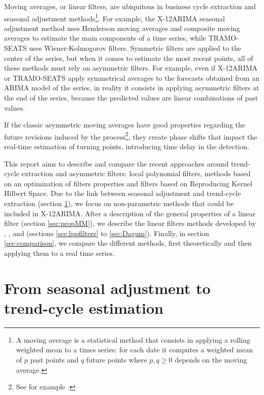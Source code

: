 \documentclass[
  12pt,
  ,
  a4paper]{article}
\newcommand\1{\mathds{1}}
\begin{document}
Moving averages, or linear filters, are ubiquitous in business cycle extraction and seasonal adjustment methods\footnote{
  A moving average is a statistical method that consists in applying a rolling weighted mean to a times series: for each date it computes a weighted mean of \(p\) past points and \(q\) future points where \(p,q\geq0\) depends on the moving average.}.
For example, the X-12ARIMA seasonal adjustment method uses Henderson moving averages and composite moving averages to estimate the main components of a time series, while TRAMO-SEATS uses Wiener-Kolmogorov filters.
Symmetric filters are applied to the center of the series, but when it comes to estimate the most recent points, all of these methods must rely on asymmetric filters.
For example, even if X-12ARIMA or TRAMO-SEATS apply symmetrical averages to the forecasts obtained from an ARIMA model of the series, in reality it consists in applying asymmetric filters at the end of the series, because the predicted values are linear combinations of past values.

If the classic asymmetric moving averages have good properties regarding the future revisions induced by the process\footnote{See for example \textcite{pierce1980SA}.}, they create phase shifts that impact the real-time estimation of turning points, introducing time delay in the detection.

This report aims to describe and compare the recent approaches around trend-cycle extraction and asymmetric filters: local polynomial filters, methods based on an optimization of filters properties and filters based on Reproducing Kernel Hilbert Space.
Due to the link between seasonal adjustment and trend-cycle extraction (section \ref{sec:SAtoTCE}), we focus on non-parametric methods that could be included in X-12ARIMA.
After a description of the general properties of a linear filter (section \ref{sec:propMM}), we describe the linear filters methods developed by \textcite{proietti2008}, \textcite{ch15HBSA}, \textcite{trilemmaWMR2019} and \textcite{dagumbianconcini2008} (sections \ref{sec:lppfilters} to \ref{sec:Dagum}).
Finally, in section \ref{sec:comparison}, we compare the different methods, first theoretically and then applying them to a real time series.

\newpage

\hypertarget{sec:SAtoTCE}{%
\section{From seasonal adjustment to trend-cycle estimation}\label{sec:SAtoTCE}}
\end{document}
